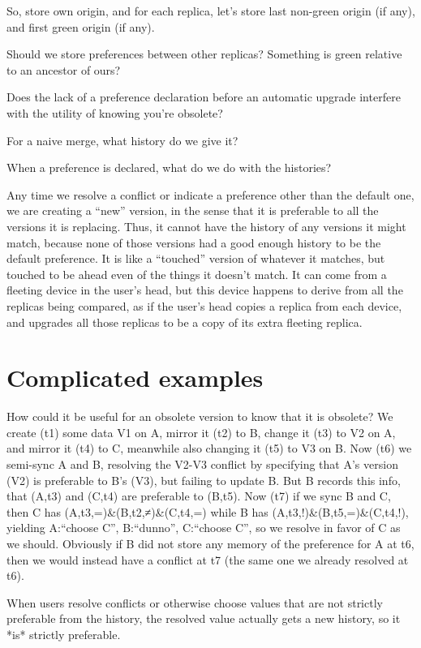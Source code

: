\documentclass{book}
\begin{document}
So, store own origin, and for each replica, let's store last non-green origin (if any), and first green origin (if any).

Should we store preferences between other replicas?  Something is green relative to an ancestor of ours?

Does the lack of a preference declaration before an automatic upgrade interfere with the utility of knowing you're obsolete?

For a naive merge, what history do we give it?

When a preference is declared, what do we do with the histories?

Any time we resolve a conflict or indicate a preference other than the default one, we are creating a ``new'' version, in the sense that it is preferable to all the versions it is replacing.  Thus, it cannot have the history of any versions it might match, because none of those versions had a good enough history to be the default preference.  It is like a ``touched'' version of whatever it matches, but touched to be ahead even of the things it doesn't match.  It can come from a fleeting device in the user's head, but this device happens to derive from all the replicas being compared, as if the user's head copies a replica from each device, and upgrades all those replicas to be a copy of its extra fleeting replica.

\section{Complicated examples}

How could it be useful for an obsolete version to know that it is obsolete?
We create (t1) some data V1 on A, mirror it (t2) to B, change it (t3) to V2 on A, and mirror it (t4) to C, meanwhile also changing it (t5) to V3 on B.  Now (t6) we semi-sync A and B, resolving the V2-V3 conflict by specifying that A's version (V2) is preferable to B's (V3), but failing to update B.  But B records this info, that (A,t3) and (C,t4) are preferable to (B,t5).  Now (t7) if we sync B and C, then C has (A,t3,=)\&(B,t2,≠)\&(C,t4,=) while B has (A,t3,!)\&(B,t5,=)\&(C,t4,!), yielding A:``choose C'', B:``dunno'', C:``choose C'', so we resolve in favor of C as we should.  Obviously if B did not store any memory of the preference for A at t6, then we would instead have a conflict at t7 (the same one we already resolved at t6).

When users resolve conflicts or otherwise choose values that are not strictly preferable from the history, the resolved value actually gets a new history, so it *is* strictly preferable.
\end{document}
